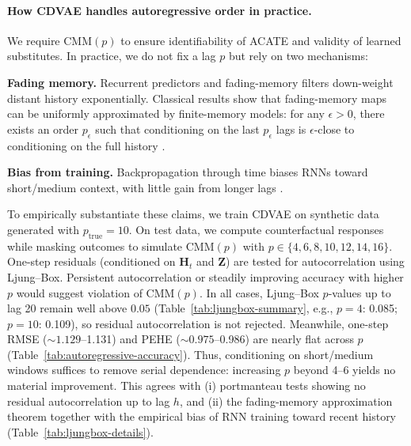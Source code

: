 \documentclass[10pt]{article} %
\begin{document}
\paragraph{How CDVAE handles autoregressive order in practice.}
We require $\mathrm{CMM}(p)$ to ensure identifiability of ACATE and validity of learned substitutes. In practice, we do not fix a lag $p$ but rely on two mechanisms: 
\begin{inparaenum}
    \item \textbf{Fading memory.}
Recurrent predictors and fading-memory filters down-weight distant history exponentially. Classical results show that fading-memory maps can be uniformly approximated by finite-memory models: for any $\epsilon>0$, there exists an order $p_\epsilon$ such that conditioning on the last $p_\epsilon$ lags is $\epsilon$-close to conditioning on the full history \citep{funahashi1993approximation, miller2018stable, gonon2021fading}.
\item \textbf{Bias from training.} Backpropagation through time biases RNNs toward short/medium context, with little gain from longer lags \citep{Khandelwal2018}.
\end{inparaenum}

To empirically substantiate these claims, we train CDVAE on synthetic data generated with $p_{\mathrm{true}}=10$. On test data, we compute counterfactual responses while masking outcomes to simulate $\mathrm{CMM}(p)$ with $p \in \{4,6,8,10,12,14,16\}$. One-step residuals (conditioned on $\mathbf{H}_t$ and $\mathbf{Z}$) are tested for autocorrelation using Ljung--Box. Persistent autocorrelation or steadily improving accuracy with higher $p$ would suggest violation of $\mathrm{CMM}(p)$. In all cases, Ljung--Box $p$-values up to lag 20 remain well above $0.05$ (Table~\ref{tab:ljungbox-summary}, e.g., $p=4$: 0.085; $p=10$: 0.109), so residual autocorrelation is not rejected. Meanwhile, one-step RMSE ($\sim 1.129$--1.131) and PEHE ($\sim 0.975$--0.986) are nearly flat across $p$ (Table~\ref{tab:autoregressive-accuracy}).  Thus, conditioning on short/medium windows suffices to remove serial dependence: increasing $p$ beyond 4--6 yields no material improvement.  This agrees with (i) portmanteau tests showing no residual autocorrelation up to lag $h$, and (ii) the fading-memory approximation theorem together with the empirical bias of RNN training toward recent history (Table~\ref{tab:ljungbox-details}).
\end{document}
